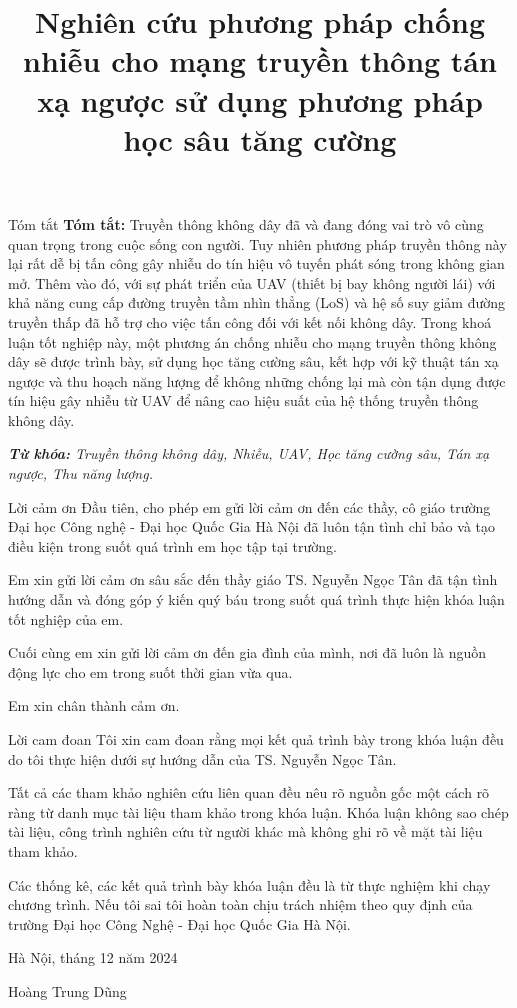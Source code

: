 \documentclass{uetgraduation}
\begin{document}
\title{Nghiên cứu phương pháp chống nhiễu cho mạng truyền thông tán xạ ngược sử dụng phương pháp học sâu tăng cường}
\makecovers
\begin{preamble}{Tóm tắt}
\textbf{Tóm tắt:} Truyền thông không dây đã và đang đóng vai trò vô cùng quan trọng trong cuộc sống con người. Tuy
nhiên phương pháp truyền thông này lại rất dễ bị tấn công gây nhiễu do tín hiệu vô tuyến phát sóng trong không gian mở.
Thêm vào đó, với sự phát triển của UAV (thiết bị bay không người lái) với khả năng cung cấp đường truyền tầm nhìn thẳng
(LoS) và hệ số suy giảm đường truyền thấp đã hỗ trợ cho việc tấn công đối với kết nối không dây. Trong khoá luận tốt nghiệp
này, một phương án chống nhiễu cho mạng truyền thông không dây sẽ được trình bày, sử dụng học tăng cường sâu, kết hợp với
kỹ thuật tán xạ ngược và thu hoạch năng lượng để không những chống lại mà còn tận dụng được tín hiệu gây nhiễu từ UAV 
để nâng cao hiệu suất của hệ thống truyền thông không dây.

\textit{\textbf{Từ khóa:} Truyền thông không dây, Nhiễu, UAV, Học tăng cường sâu, Tán xạ ngược, Thu năng lượng.}
\end{preamble}
\begin{preamble}{Lời cảm ơn}
    Đầu tiên, cho phép em gửi lời cảm ơn đến các thầy, cô giáo trường Đại học Công nghệ - Đại học
    Quốc Gia Hà Nội đã luôn tận tình chỉ bảo và tạo điều kiện trong suốt quá trình em học
    tập tại trường.
    
    Em xin gửi lời cảm ơn sâu sắc đến thầy giáo TS. Nguyễn Ngọc Tân đã tận tình
    hướng dẫn và đóng góp ý kiến quý báu trong suốt quá trình thực hiện khóa luận tốt
    nghiệp của em.
    
    Cuối cùng em xin gửi lời cảm ơn đến gia đình của mình, nơi đã luôn là nguồn động lực cho em
    trong suốt thời gian vừa qua.
    
    Em xin chân thành cảm ơn.
\end{preamble}
\begin{preamble}{Lời cam đoan}
Tôi xin cam đoan rằng mọi kết quả trình bày trong khóa luận đều do tôi thực hiện
dưới sự hướng dẫn của TS. Nguyễn Ngọc Tân.

Tất cả các tham khảo nghiên cứu liên quan đều nêu rõ nguồn gốc một cách rõ ràng từ 
danh mục tài liệu tham khảo trong khóa luận. Khóa luận không sao chép tài liệu, 
công trình nghiên cứu từ người khác mà không ghi rõ về mặt tài liệu tham khảo.

Các thống kê, các kết quả trình bày khóa luận đều là từ thực nghiệm khi chạy chương trình. Nếu tôi sai 
tôi hoàn toàn chịu trách nhiệm theo quy định của trường Đại học Công Nghệ - Đại học Quốc Gia Hà Nội.

\begin{flushright}
    Hà Nội, tháng 12 năm 2024

    \vspace{45pt}
    Hoàng Trung Dũng
\end{flushright}
\end{preamble}
\end{document}
